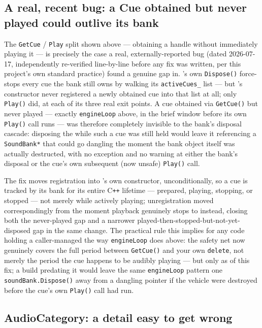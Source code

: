 \subsection{A real, recent bug: a Cue obtained but never played could outlive its bank}

The \texttt{GetCue} / \texttt{Play} split shown above --- obtaining a  handle
without immediately playing it --- is precisely the case a real, externally-reported bug (dated
2026-07-17, independently re-verified line-by-line before any fix was written, per this
project's own standard practice) found a genuine gap in. 's own
\texttt{Dispose()} force-stops every cue the bank still owns by walking its
\texttt{activeCues\_} list --- but 's constructor never registered a newly
obtained cue into that list at all; only \texttt{Play()} did, at each of its three real exit
points. A cue obtained via \texttt{GetCue()} but never played --- exactly \texttt{engineLoop}
above, in the brief window before its own \texttt{Play()} call runs --- was therefore
completely invisible to the bank's disposal cascade: disposing the  while
such a cue was still held would leave it referencing a \texttt{SoundBank*} that could go
dangling the moment the bank object itself was actually destructed, with no exception and no
warning at either the bank's disposal or the cue's own subsequent (now unsafe) \texttt{Play()}
call.

The fix moves registration into 's own constructor, unconditionally, so a cue is
tracked by its bank for its entire C\texttt{++} lifetime --- prepared, playing, stopping, or
stopped --- not merely while actively playing; unregistration moved correspondingly from the
moment playback genuinely stops to  instead, closing both the
never-played gap and a narrower played-then-stopped-but-not-yet-disposed gap in the same
change. The practical rule this implies for any code holding a caller-managed 
the way \texttt{engineLoop} does above: the safety net now genuinely covers the full period
between \texttt{GetCue()} and your own \texttt{delete}, not merely the period the cue happens
to be audibly playing --- but only as of this fix; a build predating it would leave the same
\texttt{engineLoop} pattern one \texttt{soundBank.Dispose()} away from a dangling pointer if
the vehicle were destroyed before the cue's own \texttt{Play()} call had run.

\subsection{AudioCategory: a detail easy to get wrong}

